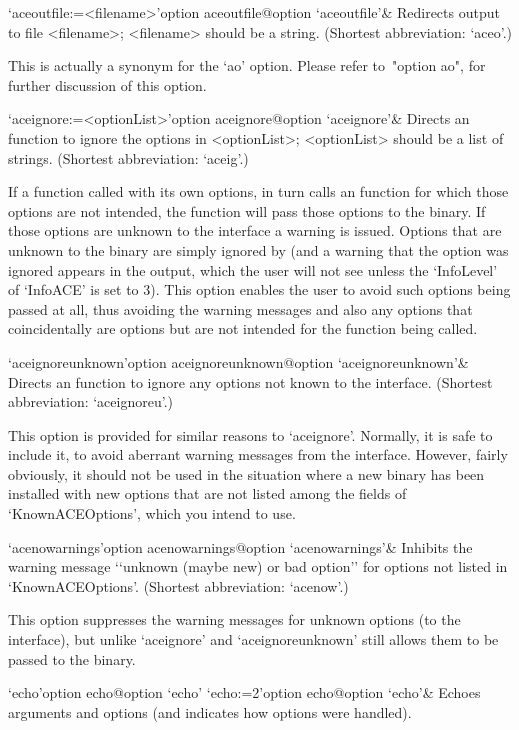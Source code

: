 \>`aceoutfile:=<filename>'{option aceoutfile}@{option `aceoutfile'}&
Redirects {\ACE} output to file <filename>;  <filename>  should  be  a
string. (Shortest abbreviation: `aceo'.)

This  is  actually  a  synonym  for  the  `ao'  option.  Please  refer
to~"option ao", for further discussion of this option.

\>`aceignore:=<optionList>'{option aceignore}@{option `aceignore'}&
Directs an {\ACE} function to  ignore  the  options  in  <optionList>;
<optionList> should be a list of strings.
(Shortest abbreviation: `aceig'.)

If a function called with its own options, in  turn  calls  an  {\ACE}
function for which those options are not intended, the {\ACE} function
will pass those options to the {\ACE} binary.  If  those  options  are
unknown to the {\ACE} interface a warning is issued. Options that  are
unknown to the {\ACE} binary are  simply  ignored  by  {\ACE}  (and  a
warning that the option was ignored  appears  in  the  {\ACE}  output,
which the user will not see unless the `InfoLevel' of `InfoACE' is set
to 3). This option enables the user to avoid such options being passed
at all, thus avoiding the warning messages and also any  options  that
coincidentally are {\ACE} options but are not intended for the  {\ACE}
function being called.

\>`aceignoreunknown'{option aceignoreunknown}@{option `aceignoreunknown'}&
Directs an {\ACE} function to  ignore  any  options  not known to the
{\ACE} interface.
(Shortest abbreviation: `aceignoreu'.)

This option is provided for similar reasons to `aceignore'.  Normally,
it is safe to include it, to avoid aberrant warning messages from  the
{\ACE} interface. However, fairly obviously, it should not be used  in
the situation where a new {\ACE} binary has been  installed  with  new
options that are not listed among  the  fields  of  `KnownACEOptions',
which you intend to use.

\>`acenowarnings'{option acenowarnings}@{option `acenowarnings'}& 
Inhibits the warning message \lq{}`unknown (maybe new) or bad option''
for options not listed in `KnownACEOptions'.
(Shortest abbreviation: `acenow'.)

This option suppresses the warning messages for  unknown  options  (to
the {\ACE} interface), but unlike `aceignore'  and  `aceignoreunknown'
still allows them to be passed to the {\ACE} binary.

\>`echo'{option echo}@{option `echo'} 
\>`echo:=2'{option echo}@{option `echo'}& 
Echoes arguments and options (and indicates how options were handled).

